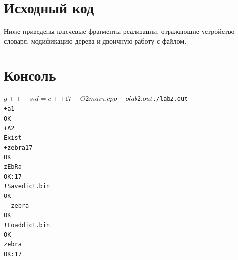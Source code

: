 \section{Исходный код}

Ниже приведены ключевые фрагменты реализации, отражающие устройство словаря,
модификацию дерева и двоичную работу с файлом.










\pagebreak

\section{Консоль}
\begin{alltt}
$ g++ -std=c++17 -O2 main.cpp -o lab2.out
$ ./lab2.out
+ a 1
OK
+ A 2
Exist
+ zebra 17
OK
zEbRa
OK: 17
! Save dict.bin
OK
-\ zebra
OK
! Load dict.bin
OK
zebra
OK: 17
\end{alltt}
\pagebreak
